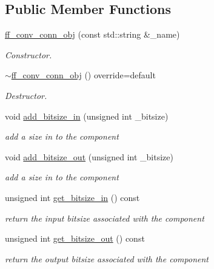 \subsection*{Public Member Functions}
\begin{DoxyCompactItemize}
\item 
\hyperlink{classff__conv__conn__obj_aa0d7869e8c93b47c55d8a351cc9336cf}{ff\+\_\+conv\+\_\+conn\+\_\+obj} (const std\+::string \&\+\_\+name)
\begin{DoxyCompactList}\small\item\em Constructor. \end{DoxyCompactList}\item 
\hyperlink{classff__conv__conn__obj_abf2948874c4736388020cdf5378dbe9d}{$\sim$ff\+\_\+conv\+\_\+conn\+\_\+obj} () override=default
\begin{DoxyCompactList}\small\item\em Destructor. \end{DoxyCompactList}\item 
void \hyperlink{classff__conv__conn__obj_a44d80e2f2bd178d304f6ed24bf246edc}{add\+\_\+bitsize\+\_\+in} (unsigned int \+\_\+bitsize)
\begin{DoxyCompactList}\small\item\em add a size in to the component \end{DoxyCompactList}\item 
void \hyperlink{classff__conv__conn__obj_ab4e707f811ce132263067bdeb32b6a3c}{add\+\_\+bitsize\+\_\+out} (unsigned int \+\_\+bitsize)
\begin{DoxyCompactList}\small\item\em add a size in to the component \end{DoxyCompactList}\item 
unsigned int \hyperlink{classff__conv__conn__obj_ad0fc263a81446cafb865e56c8766f67e}{get\+\_\+bitsize\+\_\+in} () const
\begin{DoxyCompactList}\small\item\em return the input bitsize associated with the component \end{DoxyCompactList}\item 
unsigned int \hyperlink{classff__conv__conn__obj_a105bbece599841f31c17871d0a738fc5}{get\+\_\+bitsize\+\_\+out} () const
\begin{DoxyCompactList}\small\item\em return the output bitsize associated with the component \end{DoxyCompactList}\end{DoxyCompactItemize}
